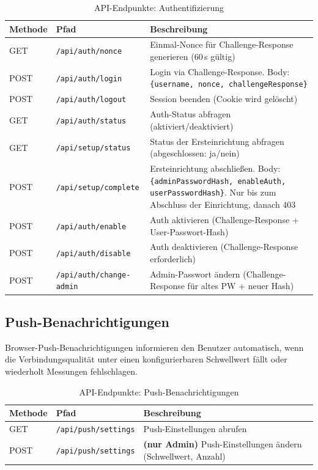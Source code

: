 \begin{table}[h]
\centering
\small
\begin{tabular}{|l|l|p{7cm}|}
\hline
\textbf{Methode} & \textbf{Pfad} & \textbf{Beschreibung} \\
\hline
GET & \texttt{/api/auth/nonce} & Einmal-Nonce für Challenge-Response
  generieren (60\,s gültig) \\
\hline
POST & \texttt{/api/auth/login} & Login via Challenge-Response.
  Body: \texttt{\{username, nonce, challengeResponse\}} \\
\hline
POST & \texttt{/api/auth/logout} & Session beenden (Cookie wird gelöscht) \\
\hline
GET & \texttt{/api/auth/status} & Auth-Status abfragen (aktiviert/deaktiviert) \\
\hline
GET & \texttt{/api/setup/status} & Status der Ersteinrichtung abfragen (abgeschlossen: ja/nein) \\
\hline
POST & \texttt{/api/setup/complete} & Ersteinrichtung abschließen.
  Body: \texttt{\{adminPasswordHash, enableAuth, userPasswordHash\}}.
  Nur bis zum Abschluss der Einrichtung, danach 403 \\
\hline
POST & \texttt{/api/auth/enable} & Auth aktivieren (Challenge-Response + User-Passwort-Hash) \\
\hline
POST & \texttt{/api/auth/disable} & Auth deaktivieren (Challenge-Response erforderlich) \\
\hline
POST & \texttt{/api/auth/change-admin} & Admin-Passwort ändern
  (Challenge-Response für altes PW + neuer Hash) \\
\hline
\end{tabular}
\caption{API-Endpunkte: Authentifizierung}
\end{table}

\subsection{Push-Benachrichtigungen}

Browser-Push-Benachrichtigungen informieren den Benutzer automatisch, wenn die
Verbindungsqualität unter einen konfigurierbaren Schwellwert fällt oder wiederholt
Messungen fehlschlagen.

\begin{table}[h]
\centering
\small
\begin{tabular}{|l|l|p{7cm}|}
\hline
\textbf{Methode} & \textbf{Pfad} & \textbf{Beschreibung} \\
\hline
GET & \texttt{/api/push/settings} & Push-Einstellungen abrufen \\
\hline
POST & \texttt{/api/push/settings} & \textbf{(nur Admin)} Push-Einstellungen ändern
  (Schwellwert, Anzahl) \\
\hline
\end{tabular}
\caption{API-Endpunkte: Push-Benachrichtigungen}
\end{table}

